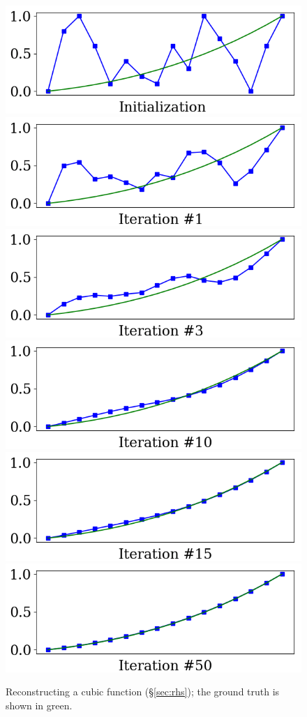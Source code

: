 \documentclass[notitlepage]{report}
\begin{document}
\inputminted[frame=single,linenos=true]{python}{listings/example_3.4.py}
\begin{figure}[ht]
    \centering
    \includegraphics[width=.32\linewidth]{example_3.4_0.png}
    \includegraphics[width=.32\linewidth]{example_3.4_1.png}
    \includegraphics[width=.32\linewidth]{example_3.4_2.png}
    \includegraphics[width=.32\linewidth]{example_3.4_3.png}
    \includegraphics[width=.32\linewidth]{example_3.4_4.png}
    \includegraphics[width=.32\linewidth]{example_3.4_5.png}
    \caption{Reconstructing a cubic function (\S\ref{sec:rhs}); the ground truth is shown in green.}
    \label{fig:linsys_smooth_constrain}
\end{figure}



\end{document}
